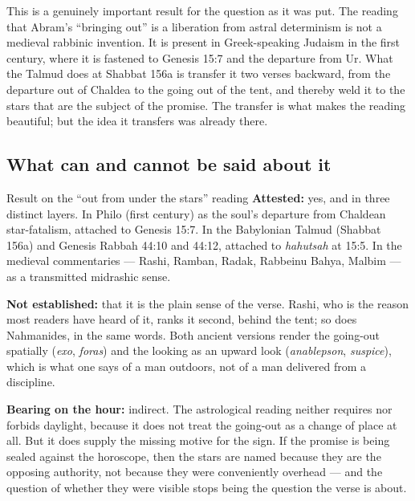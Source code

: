 This is a genuinely important result for the question as it was put. The reading
that Abram's ``bringing out'' is a liberation from astral determinism is not a
medieval rabbinic invention. It is present in Greek-speaking Judaism in the
first century, where it is fastened to Genesis 15:7 and the departure from Ur.
What the Talmud does at Shabbat 156a is transfer it two verses backward, from
the departure out of Chaldea to the going out of the tent, and thereby weld it
to the stars that are the subject of the promise. The transfer is what makes the
reading beautiful; but the idea it transfers was already there.

\subsection{What can and cannot be said about it}

\begin{studybox}{Result on the ``out from under the stars'' reading}
\textbf{Attested:} yes, and in three distinct layers. In Philo (first century)
as the soul's departure from Chaldean star-fatalism, attached to Genesis 15:7.
In the Babylonian Talmud (Shabbat 156a) and Genesis Rabbah 44:10 and 44:12,
attached to \textit{hahutsah} at 15:5. In the medieval commentaries --- Rashi,
Ramban, Radak, Rabbeinu Bahya, Malbim --- as a transmitted midrashic sense.

\textbf{Not established:} that it is the plain sense of the verse. Rashi, who is
the reason most readers have heard of it, ranks it second, behind the tent; so
does Nahmanides, in the same words. Both ancient versions render the going-out
spatially (\textit{exo}, \textit{foras}) and the looking as an upward look
(\textit{anablepson}, \textit{suspice}), which is what one says of a man
outdoors, not of a man delivered from a discipline.

\textbf{Bearing on the hour:} indirect. The astrological reading neither
requires nor forbids daylight, because it does not treat the going-out as a
change of place at all. But it does supply the missing motive for the sign. If
the promise is being sealed against the horoscope, then the stars are named
because they are the opposing authority, not because they were conveniently
overhead --- and the question of whether they were visible stops being the
question the verse is about.
\end{studybox}
